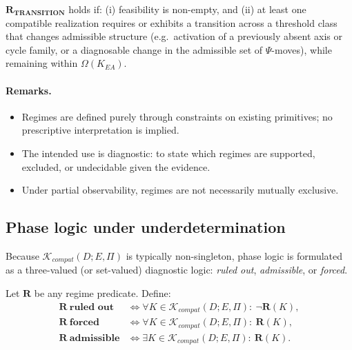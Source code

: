 \begin{definition}
\label{def:regime_transition}
$\mathbf{R_{TRANSITION}}$ holds if:
(i) feasibility is non-empty, and
(ii) at least one compatible realization requires or exhibits a transition across
a threshold class that changes admissible structure (e.g.\ activation of a
previously absent axis or cycle family, or a diagnosable change in the admissible
set of $\Psi$-moves), while remaining within $\Omega(K_{EA})$.
\end{definition}

\paragraph{Remarks.}
\begin{itemize}
\item Regimes are defined purely through constraints on existing primitives; no
prescriptive interpretation is implied.
\item The intended use is diagnostic: to state which regimes are supported,
excluded, or undecidable given the evidence.
\item Under partial observability, regimes are not necessarily mutually exclusive.
\end{itemize}

\subsection{Phase logic under underdetermination}
Because $\mathcal{K}_{compat}(D;E,\Pi)$ is typically non-singleton, phase logic is
formulated as a three-valued (or set-valued) diagnostic logic:
\emph{ruled out}, \emph{admissible}, or \emph{forced}.

\begin{definition}
\label{def:phase_status}
Let $\mathbf{R}$ be any regime predicate.
Define:
\begin{align*}
\mathbf{R}\ \textbf{ruled out}
&\iff \forall K \in \mathcal{K}_{compat}(D;E,\Pi):\ \neg \mathbf{R}(K),\\
\mathbf{R}\ \textbf{forced}
&\iff \forall K \in \mathcal{K}_{compat}(D;E,\Pi):\ \mathbf{R}(K),\\
\mathbf{R}\ \textbf{admissible}
&\iff \exists K \in \mathcal{K}_{compat}(D;E,\Pi):\ \mathbf{R}(K).
\end{align*}
\end{definition}

